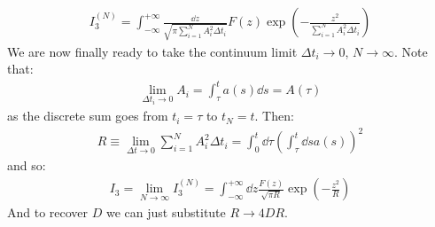 \documentclass[../template.tex]{subfiles}
\begin{document}
\begin{align*}
    I_3^{(N)} = \int_{-\infty}^{+\infty} \frac{\dd{z}}{\sqrt{\pi \sum_{i=1}^N A_i^2 \Delta t_i}} F(z) \exp\left(-\frac{z^2}{\sum_{i=1}^N A_i^2 \Delta t_i} \right) 
\end{align*}
We are now finally ready to take the continuum limit $\Delta t_i \to 0$, $N \to\infty$. Note that:
\begin{align}
    \lim_{\Delta t_i \to 0} A_i = \int_{\tau}^t a(s) \dd{s} = A(\tau)
    \label{eqn:Atau}
\end{align}  
as the discrete sum goes from $t_i = \tau$ to $t_N = t$. Then:
\begin{align*}
    R \equiv \lim_{\Delta t \to 0 } \sum_{i=1}^N A_i^2 \Delta t_i = \int_0^t \dd{\tau} \left(\int_{\tau}^t \dd{s} a(s) \right)^2
\end{align*}  
and so:
\begin{align*}
    I_3 = \lim_{N \to\infty } I_3^{(N)} = \int_{-\infty}^{+\infty} \dd{z} \frac{F(z)}{\sqrt{\pi R}} \exp\left(-\frac{z^2}{R} \right) 
\end{align*}
And to recover $D$ we can just substitute $R \to 4 D R$.   
\end{document}
